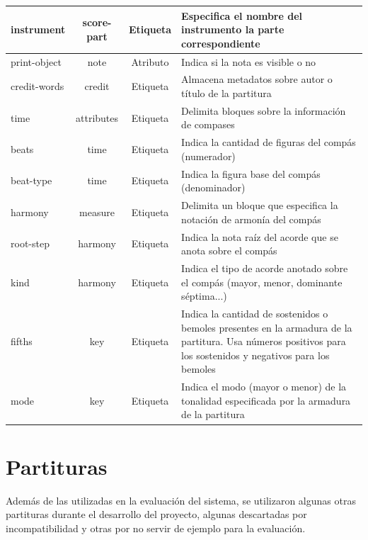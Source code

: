 \begin{center}
\begin{longtable}{ | l | c | c | l | }
 		instrument & score-part & Etiqueta & \parbox[l]{6.5cm}{\raggedright Especifica el nombre del instrumento la parte correspondiente} \\ \hline
 		print-object & note & Atributo & \parbox[l]{6.5cm}{\raggedright Indica si la nota es visible o no} \\ \hline
 		credit-words & credit & Etiqueta & \parbox[l]{6.5cm}{\raggedright Almacena metadatos sobre autor o título de la partitura} \\ \hline
 		time & attributes & Etiqueta & \parbox[l]{6.5cm}{\raggedright Delimita bloques sobre la información de compases} \\ \hline
 		beats & time & Etiqueta & \parbox[l]{6.5cm}{\raggedright Indica la cantidad de figuras del compás (numerador)} \\ \hline
 		beat-type & time & Etiqueta & \parbox[l]{6.5cm}{\raggedright Indica la figura base del compás (denominador)} \\ \hline
 		harmony & measure & Etiqueta & \parbox[l]{6.5cm}{\raggedright Delimita un bloque que especifica la notación de armonía del compás} \\ \hline
 		root-step & harmony & Etiqueta & \parbox[l]{6.5cm}{\raggedright Indica la nota raíz del acorde que se anota sobre el compás} \\ \hline
 		kind & harmony & Etiqueta & \parbox[l]{6.5cm}{\raggedright Indica el tipo de acorde anotado sobre el compás (mayor, menor, dominante séptima...)} \\ \hline
 		fifths & key & Etiqueta & \parbox[l]{6.5cm}{\raggedright Indica la cantidad de sostenidos o bemoles presentes en la armadura de la partitura. Usa números positivos para los sostenidos y negativos para los bemoles} \\ \hline
 		mode & key & Etiqueta & \parbox[l]{6.5cm}{\raggedright Indica el modo (mayor o menor) de la tonalidad especificada por la armadura de la partitura} \\ \hline
 	\end{longtable}
 \end{center} 
 
 \chapter{Partituras}
 Además de las utilizadas en la evaluación del sistema, se utilizaron algunas otras partituras durante el desarrollo del proyecto, algunas descartadas por incompatibilidad y otras por no servir de ejemplo para la evaluación.
 
